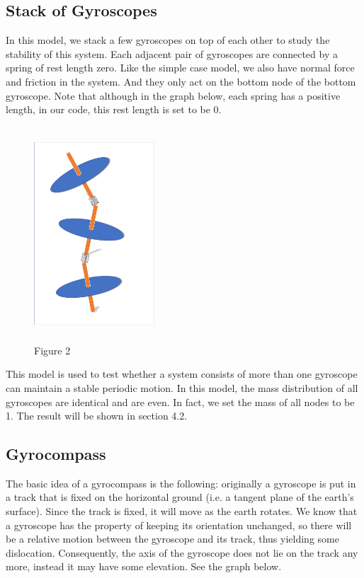 \documentclass[12pt]{article}
\renewcommand{\(}{\left (}
\renewcommand{\)}{\right )}
\begin{document}
\subsection{Stack of Gyroscopes}
\hspace{5mm} In this model, we stack a few gyroscopes on top of each other to study the stability of this system. Each adjacent pair of gyroscopes are connected by a spring of rest length zero. Like the simple case model, we also have normal force and friction in the system. And they only act on the bottom node of the bottom gyroscope. Note that although in the graph below, each spring has a positive length, in our code, this rest length is set to be 0.
\begin {figure}[ht]
	\centering
    \includegraphics[width=0.4\textwidth, height=8cm]{stack_model.png}
    \caption*{\small Figure 2}
\end {figure}

This model is used to test whether a system consists of more than one gyroscope can maintain a stable periodic motion. In this model, the mass distribution of all gyroscopes are identical and are even. In fact, we set the mass of all nodes to be 1. The result will be shown in section 4.2.

\subsection{Gyrocompass}
\hspace{5mm} The basic idea of a gyrocompass is the following: originally a gyroscope is put in a track that is fixed on the horizontal ground (i.e. a tangent plane of the earth's surface). Since the track is fixed, it will move as the earth rotates. We know that a gyroscope has the property of keeping its orientation unchanged, so there will be a relative motion between the gyroscope and its track, thus yielding some dislocation. Consequently, the axis of the gyroscope does not lie on the track any more, instead it may have some elevation. See the graph below.
\end{document}
